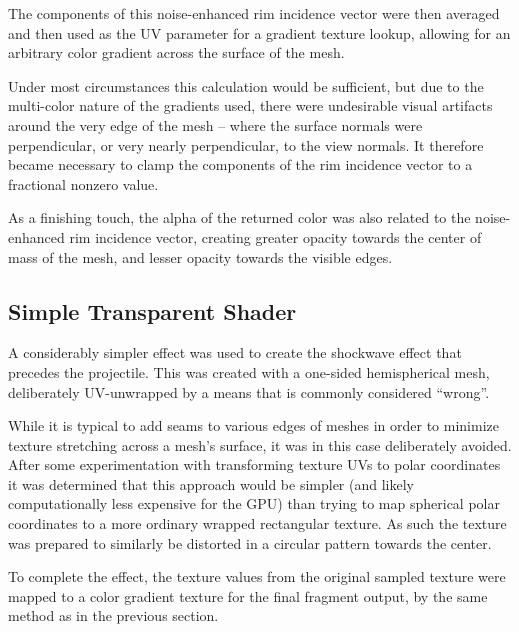 The components of this noise-enhanced rim incidence vector were then averaged and then used as the UV parameter for a gradient texture lookup, allowing for an arbitrary color gradient across the surface of the mesh.

Under most circumstances this calculation would be sufficient, but due to the multi-color nature of the gradients used, there were undesirable visual artifacts around the very edge of the mesh -- where the surface normals were perpendicular, or very nearly perpendicular, to the view normals. It therefore became necessary to clamp the components of the rim incidence vector to a fractional nonzero value.

As a finishing touch, the alpha of the returned color was also related to the noise-enhanced rim incidence vector, creating greater opacity towards the center of mass of the mesh, and lesser opacity towards the visible edges.

\subsection{Simple Transparent Shader}
A considerably simpler effect was used to create the shockwave effect that precedes the projectile. This was created with a one-sided hemispherical mesh, deliberately UV-unwrapped by a means that is commonly considered ``wrong''.


While it is typical to add seams to various edges of meshes in order to minimize texture stretching across a mesh's surface, it was in this case deliberately avoided. After some experimentation with transforming texture UVs to polar coordinates it was determined that this approach would be simpler (and likely computationally less expensive for the GPU) than trying to map spherical polar coordinates to a more ordinary wrapped rectangular texture. As such the texture was prepared to similarly be distorted in a circular pattern towards the center.

To complete the effect, the texture values from the original sampled texture were mapped to a color gradient texture for the final fragment output, by the same method as in the previous section.



